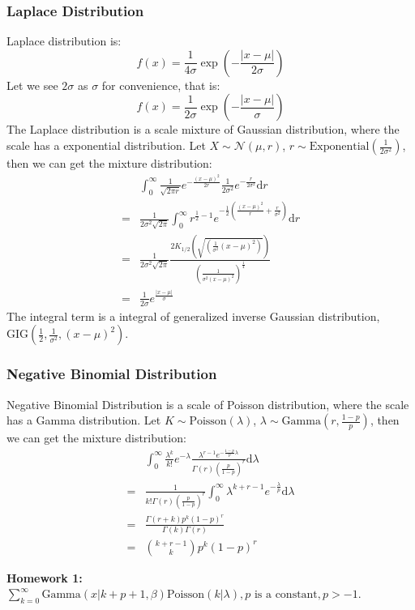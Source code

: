 \documentclass[11pt]{article}
\def\MN{{\mathcal N}}
\begin{document}
\subsubsection{Laplace Distribution}
Laplace distribution is:
$$f(x) = \frac{1}{4\sigma}\exp(-\frac{|x-\mu|}{2\sigma})$$
Let we see $2\sigma$ as $\sigma$ for convenience, that is:
$$f(x) = \frac{1}{2\sigma}\exp(-\frac{|x-\mu|}{\sigma})$$
The Laplace distribution is a scale mixture of Gaussian distribution, where the scale has a exponential distribution.
Let $X \sim \MN(\mu, r)$, $r \sim \mbox{Exponential}(\frac{1}{2\sigma^2})$, then we can get the mixture distribution:
\[\begin{split} &
\int_0^\infty \frac{1}{\sqrt{2\pi r}} e^{-\frac{(x-\mu)^2}{2r}}
\frac{1}{2\sigma^2} e^{-\frac{r}{2\sigma^2}} \mathrm{d}r  \\
 = & \frac{1}{2\sigma^2 \sqrt{2\pi}}  \int_0^\infty
 r^{\frac{1}{2} - 1} e^{-\frac{1}{2} \left( \frac{(x-\mu)^2}{r} + \frac{r}{\sigma^2}\right)} \mathrm{d}r  \\
 = & \frac{1}{2\sigma^2 \sqrt{2\pi}} \frac{2K_{1/2}\left(\sqrt{(\frac{1}{\sigma^2}(x-\mu)^2)}\right)}{(\frac{1}{\sigma^2(x-\mu)^2})^{\frac{1}{4}}} \\
 = &\frac{1}{2\sigma} e^{\frac{|x-\mu|}{\sigma}}
\end{split}\]
The integral term is a integral of generalized inverse Gaussian distribution, $\mbox{GIG}(\frac{1}{2},\frac{1}{\sigma^2},(x-\mu)^2)$.

\subsubsection{Negative Binomial Distribution}
Negative Binomial Distribution is a scale of Poisson distribution, where the scale has a Gamma distribution.
Let $K \sim \mbox{Poisson}(\lambda)$, $\lambda \sim \mbox{Gamma}(r, \frac{1-p}{p})$, then we can get the mixture distribution:
\[\begin{split}
&  \int_0^\infty \frac{\lambda^k}{k!} e^{-\lambda}
\frac{\lambda^{r-1} e^{-\frac{1-p}{p} \lambda}}{\Gamma(r) (\frac{p}{1-p})^r} \mathrm{d}\lambda \\
= & \frac{1}{k! \Gamma(r) (\frac{p}{1-p})^r}  \int_0^\infty  \lambda^{k+r-1}  e^{-\frac{\lambda}{p}} \mathrm{d}\lambda \\
=&\frac{\Gamma(r+k)p^k(1-p)^r}{\Gamma(k)\Gamma(r)}\\
= & {k+r-1 \choose k} p^k (1-p)^r
\end{split}\]

\textbf{Homework 1:}   $\sum\limits_{k=0}^\infty \mbox{Gamma}(x | k+p+1, \beta) \mbox{Poisson} (k | \lambda),  p\mbox{ is a constant},p>-1$.
\end{document}
